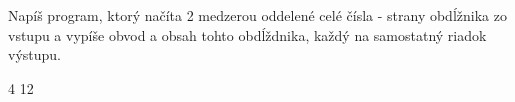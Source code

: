 




Napíš program, ktorý načíta 2 medzerou oddelené celé čísla - strany obdĺžnika zo vstupu a vypíše obvod a obsah tohto obdĺždnika, každý na samostatný riadok výstupu.

 4
12
\koniec


